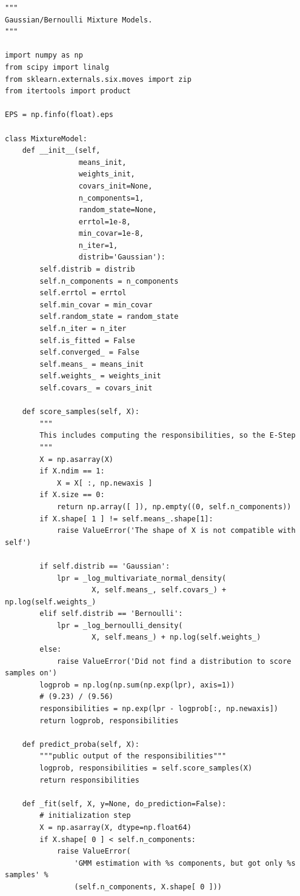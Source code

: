\begin{verbatim}
"""
Gaussian/Bernoulli Mixture Models.
"""

import numpy as np
from scipy import linalg
from sklearn.externals.six.moves import zip
from itertools import product

EPS = np.finfo(float).eps

class MixtureModel:
    def __init__(self,
                 means_init,
                 weights_init,
                 covars_init=None,
                 n_components=1,
                 random_state=None,
                 errtol=1e-8,
                 min_covar=1e-8,
                 n_iter=1,
                 distrib='Gaussian'):
        self.distrib = distrib
        self.n_components = n_components
        self.errtol = errtol
        self.min_covar = min_covar
        self.random_state = random_state
        self.n_iter = n_iter
        self.is_fitted = False
        self.converged_ = False
        self.means_ = means_init
        self.weights_ = weights_init
        self.covars_ = covars_init

    def score_samples(self, X):
        """
        This includes computing the responsibilities, so the E-Step
        """
        X = np.asarray(X)
        if X.ndim == 1:
            X = X[ :, np.newaxis ]
        if X.size == 0:
            return np.array([ ]), np.empty((0, self.n_components))
        if X.shape[ 1 ] != self.means_.shape[1]:
            raise ValueError('The shape of X is not compatible with self')

        if self.distrib == 'Gaussian':
            lpr = _log_multivariate_normal_density(
                    X, self.means_, self.covars_) + np.log(self.weights_)
        elif self.distrib == 'Bernoulli':
            lpr = _log_bernoulli_density(
                    X, self.means_) + np.log(self.weights_)
        else:
            raise ValueError('Did not find a distribution to score samples on')
        logprob = np.log(np.sum(np.exp(lpr), axis=1))
        # (9.23) / (9.56)
        responsibilities = np.exp(lpr - logprob[:, np.newaxis])
        return logprob, responsibilities

    def predict_proba(self, X):
        """public output of the responsibilities"""
        logprob, responsibilities = self.score_samples(X)
        return responsibilities

    def _fit(self, X, y=None, do_prediction=False):
        # initialization step
        X = np.asarray(X, dtype=np.float64)
        if X.shape[ 0 ] < self.n_components:
            raise ValueError(
                'GMM estimation with %s components, but got only %s samples' %
                (self.n_components, X.shape[ 0 ]))


\end{verbatim}

